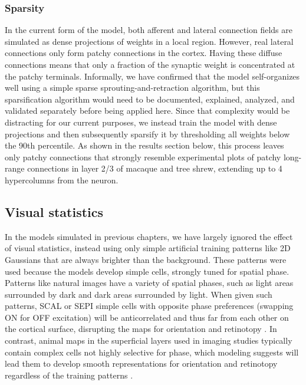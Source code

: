\subsubsection{Sparsity}

In the current form of the model, both afferent and lateral connection
fields are simulated as dense projections of weights in a local
region. However, real lateral connections only form patchy connections
in the cortex. Having these diffuse connections means that only a
fraction of the synaptic weight is concentrated at the patchy
terminals. Informally, we have confirmed that the model self-organizes
well using a simple sparse sprouting-and-retraction algorithm, but
this sparsification algorithm would need to be documented, explained,
analyzed, and validated separately before being applied here. Since
that complexity would be distracting for our current purposes, we
instead train the model with dense projections and then subsequently
sparsify it by thresholding all weights below the 90th percentile. As
shown in the results section below, this process leaves only patchy
connections that strongly resemble experimental plots of patchy
long-range connections in layer 2/3 of macaque and tree shrew,
extending up to 4 hypercolumns from the neuron.

\subsection{Visual statistics}

In the models simulated in previous chapters, we have largely ignored
the effect of visual statistics, instead using only simple artificial
training patterns like 2D Gaussians that are always brighter than the
background.  These patterns were used because the models develop
simple cells, strongly tuned for spatial phase.  Patterns like natural
images have a variety of spatial phases, such as light areas
surrounded by dark and dark areas surrounded by light.  When given
such patterns, SCAL or SEPI simple cells with opposite phase
preferences (swapping ON for OFF excitation) will be anticorrelated
and thus far from each other on the cortical surface, disrupting the
maps for orientation and retinotopy \citep{Miikkulainen2005}.  In
contrast, animal maps in the superficial layers used in imaging
studies typically contain complex cells not highly selective for
phase, which modeling suggests will lead them to develop smooth
representations for orientation and retinotopy regardless of the
training patterns \citep{Antolik2010}.

